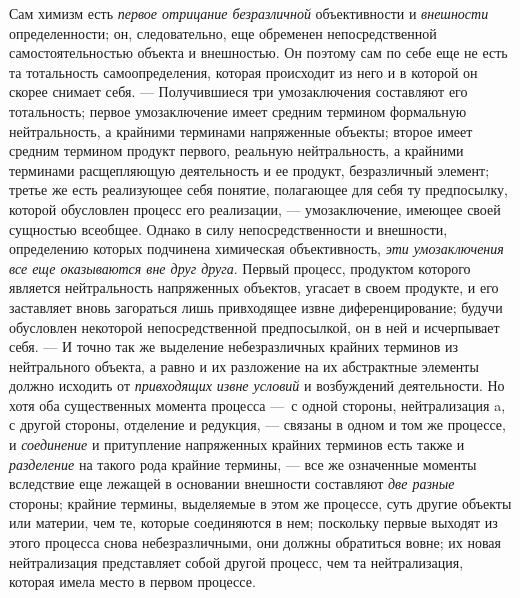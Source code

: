 \documentclass[twoside]{article}
\begin{document}
{{{Сам химизм есть {\em первое
отрицание безразличной} объективности и
{\em внешности}
определенности; он, следовательно, еще обременен
непосредственной самостоятельностью объекта и внешностью. Он поэтому сам по
себе еще не есть та тотальность самоопределения, которая происходит из него
и в которой он скорее снимает себя. — Получившиеся три
умозаключения составляют его тотальность; первое умозаключение имеет
средним термином формальную нейтральность, а крайними терминами напряженные
объекты; второе имеет средним термином продукт первого, реальную
нейтральность, а крайними терминами расщепляющую деятельность и ее продукт,
безразличный элемент; третье же есть реализующее себя понятие, полагающее
для себя ту предпосылку, которой обусловлен процесс его реализации, —
умозаключение, имеющее своей сущностью всеобщее. Однако в
силу непосредственности и внешности, определению которых подчинена
химическая объективность, {\em эти
умозаключения все еще оказываются вне друг друга}. Первый
процесс, продуктом которого является нейтральность напряженных объектов,
угасает в своем продукте, и его заставляет вновь загораться лишь
привходящее извне диференцирование; будучи обусловлен некоторой
непосредственной предпосылкой, он в ней и исчерпывает себя. —
И точно так же выделение небезразличных крайних терминов из
нейтрального объекта, а равно и их разложение на их абстрактные элементы
должно исходить от {\em привходящих
извне условий} и возбуждений деятельности. Но хотя оба
существенных момента процесса —~с одной стороны,
нейтрализация a, с другой стороны, отделение и редукция, —
связаны в одном и том же процессе, и
{\em соединение} и
притупление напряженных крайних терминов есть также и
{\em разделение} на
такого рода крайние термины, — все же означенные моменты
вследствие еще лежащей в основании внешности составляют
{\em две разные} стороны;
крайние термины, выделяемые в этом же процессе, суть другие объекты или
материи, чем те, которые соединяются в нем; поскольку первые выходят из
этого процесса снова небезразличными, они должны обратиться
вовне; их новая нейтрализация представляет собой другой процесс, чем та
нейтрализация, которая имела место в первом процессе.

}}}
\end{document}
